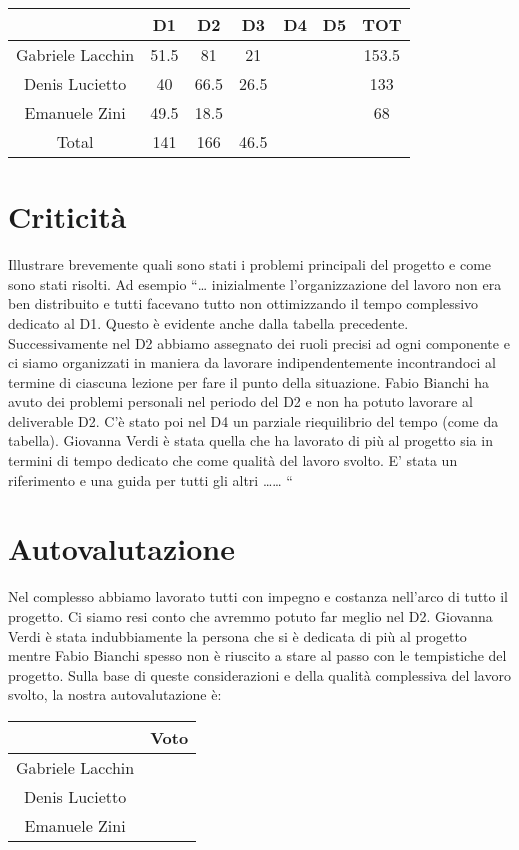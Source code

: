 \documentclass{article}
\begin{document}
\begin{center}
    \begin{tabular}{|c|c|c|c|c|c|c|}
        \hline
                         & D1   & D2   & D3   & D4 & D5 & TOT   \\
        \hline
        Gabriele Lacchin & 51.5 & 81   & 21   &    &    & 153.5 \\
        \hline
        Denis Lucietto   & 40   & 66.5 & 26.5 &    &    & 133   \\
        \hline
        Emanuele Zini    & 49.5 & 18.5 &      &    &    & 68    \\
        \hline
        Total            & 141  & 166  & 46.5 &    &    &       \\
        \hline
    \end{tabular}
\end{center}


\section{Criticità}

Illustrare brevemente quali sono stati i problemi principali del progetto e come sono stati
risolti. Ad esempio “… inizialmente l'organizzazione del lavoro non era ben distribuito e tutti
facevano tutto non ottimizzando il tempo complessivo dedicato al D1. Questo è evidente anche
dalla tabella precedente. Successivamente nel D2 abbiamo assegnato dei ruoli precisi ad ogni
componente e ci siamo organizzati in maniera da lavorare indipendentemente incontrandoci
al termine di ciascuna lezione per fare il punto della situazione. Fabio Bianchi ha avuto dei
problemi personali nel periodo del D2 e non ha potuto lavorare al deliverable D2. C'è stato poi
nel D4 un parziale riequilibrio del tempo (come da tabella). Giovanna Verdi è stata quella che
ha lavorato di più al progetto sia in termini di tempo dedicato che come qualità del lavoro
svolto. E' stata un riferimento e una guida per tutti gli altri …… “

\section{Autovalutazione}
Nel complesso abbiamo lavorato tutti con impegno e costanza nell'arco di tutto il progetto. Ci
siamo resi conto che avremmo potuto far meglio nel D2. Giovanna Verdi è stata indubbiamente
la persona che si è dedicata di più al progetto mentre Fabio Bianchi spesso non è riuscito a
stare al passo con le tempistiche del progetto. Sulla base di queste considerazioni e della
qualità complessiva del lavoro svolto, la nostra autovalutazione è:

\begin{center}
    \begin{tabular}{|c|c|}
        \hline
                         & Voto \\
        \hline
        Gabriele Lacchin &      \\
        \hline
        Denis Lucietto   &      \\
        \hline
        Emanuele Zini    &      \\
        \hline
    \end{tabular}
\end{center}
\end{document}

